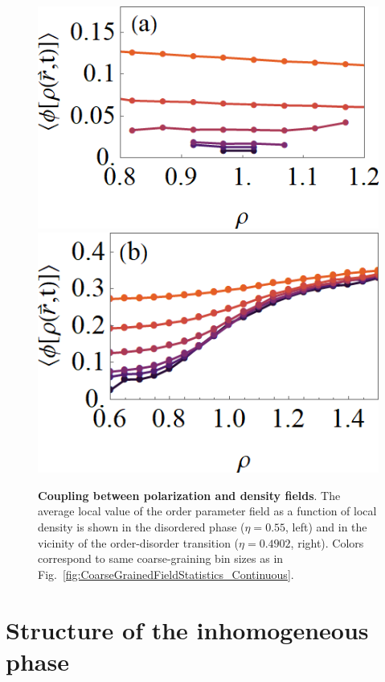\documentclass[twoside,twocolumn,9pt]{article}
\begin{document}
\begin{figure}[h]
	\centering
	\includegraphics[width=0.51\columnwidth]{phi_func_rho_dt=0.005_e=0.5500.png}
	\includegraphics[width=0.47\columnwidth]{phi_func_rho_dt=0.005_e=0.4902.png}
	\caption{\textbf{Coupling between polarization and density fields}.
        The average local value of the order parameter field as a function of local density is shown in the disordered phase ($\eta=0.55$, left) and in the vicinity of the order-disorder transition ($\eta=0.4902$, right).
		Colors correspond to same coarse-graining bin sizes as in Fig.~\ref{fig:CoarseGrainedFieldStatistics_Continuous}.
	}
	\label{fig:PolarizationDensityCoupling_Continuous}
\end{figure}

\section{Structure of the inhomogeneous phase}
\end{document}
